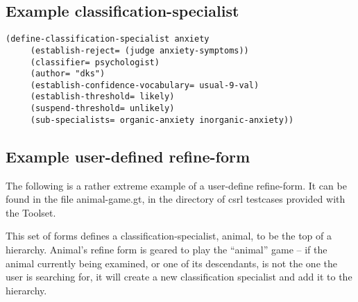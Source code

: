 \subsection{Example classification-specialist}

\begin{verbatim}
(define-classification-specialist anxiety
     (establish-reject= (judge anxiety-symptoms))
     (classifier= psychologist)
     (author= "dks")
     (establish-confidence-vocabulary= usual-9-val)
     (establish-threshold= likely)
     (suspend-threshold= unlikely)
     (sub-specialists= organic-anxiety inorganic-anxiety))
\end{verbatim}

\subsection{Example user-defined refine-form}

The following is a rather extreme example of a user-define
refine-form. It can be found in the file animal-game.gt, in the
directory of csrl testcases provided with the Toolset.

This set of forms defines a classification-specialist, animal, to be
the top of a hierarchy. Animal's refine form is geared to play the
``animal'' game -- if the animal currently being examined, or one of
its descendants, is not the one the user is searching for, it will
create a new classification specialist and add it to the hierarchy.

